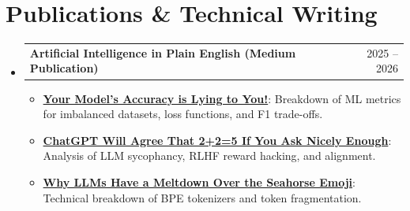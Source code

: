 \documentclass[letterpaper,11pt]{article}
\makeatletter
\newcommand{\resumeItem}[1]{
  \item\small{
    {#1 \vspace{-2pt}}
  }
}
\newcommand{\resumeProjectHeading}[2]{
    \item
    \begin{tabular*}{0.97\textwidth}{l@{\extracolsep{\fill}}r}
      \small#1 & #2 \\
    \end{tabular*}\vspace{-7pt}
}
\newcommand{\resumeSubHeadingListStart}{\begin{itemize}[leftmargin=0.15in, label={}]}
\newcommand{\resumeSubHeadingListEnd}{\end{itemize}}
\newcommand{\resumeItemListStart}{\begin{itemize}}
\newcommand{\resumeItemListEnd}{\end{itemize}\vspace{-5pt}}
\makeatother
\begin{document}
\section{Publications \& Technical Writing}
  \resumeSubHeadingListStart
    \resumeProjectHeading
      {\textbf{Artificial Intelligence in Plain English (Medium Publication)}}{2025 -- 2026}
      \resumeItemListStart
        \resumeItem{\href{https://ai.plainenglish.io/your-models-accuracy-is-lying-to-you-e4428283b49d}{\textbf{Your Model’s Accuracy is Lying to You!}}: Breakdown of ML metrics for imbalanced datasets, loss functions, and F1 trade-offs.}
        \resumeItem{\href{https://ai.plainenglish.io/chatgpt-will-agree-that-2-2-5-if-you-ask-nicely-enough-7c713832707c}{\textbf{ChatGPT Will Agree That 2+2=5 If You Ask Nicely Enough}}: Analysis of LLM sycophancy, RLHF reward hacking, and alignment.}
        \resumeItem{\href{https://ai.plainenglish.io/why-llms-have-a-complete-meltdown-over-the-seahorse-emoji-2ba7dd6efec2}{\textbf{Why LLMs Have a Meltdown Over the Seahorse Emoji}}: Technical breakdown of BPE tokenizers and token fragmentation.}
      \resumeItemListEnd
  \resumeSubHeadingListEnd

\end{document}
